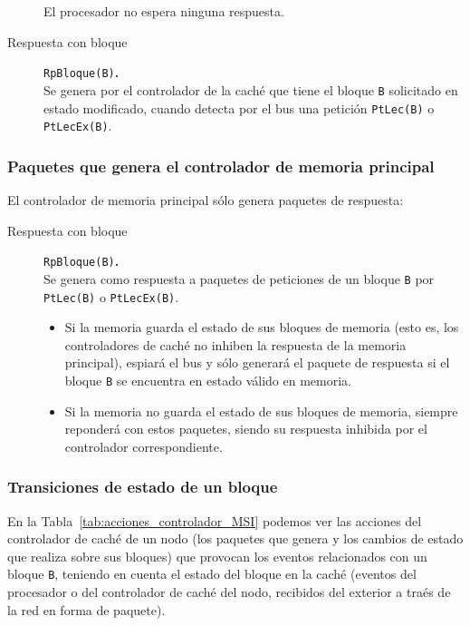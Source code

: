 \begin{description}
        El procesador no espera ninguna respuesta.
        

    \item [Respuesta con bloque] \verb|RpBloque(B)|\textbf{.}~\\
        Se genera por el controlador de la caché que tiene el bloque \verb|B| solicitado en estado modificado, cuando detecta por el bus una petición \verb|PtLec(B)| o \verb|PtLecEx(B)|.
\end{description}

\subsubsection{Paquetes que genera el controlador de memoria principal}
El controlador de memoria principal sólo genera paquetes de respuesta:
\begin{description}
    \item [Respuesta con bloque] \verb|RpBloque(B)|\textbf{.}~\\
        Se genera como respuesta a paquetes de peticiones de un bloque \verb|B| por \verb|PtLec(B)| o \verb|PtLecEx(B)|.

        \begin{itemize}
            \item Si la memoria guarda el estado de sus bloques de memoria (esto es, los controladores de caché no inhiben la respuesta de la memoria principal), espiará el bus y sólo generará el paquete de respuesta si el bloque \verb|B| se encuentra en estado válido en memoria.
            \item Si la memoria no guarda el estado de sus bloques de memoria, siempre reponderá con estos paquetes, siendo su respuesta inhibida por el controlador correspondiente.
        \end{itemize}
\end{description}

\subsubsection{Transiciones de estado de un bloque}
En la Tabla~\ref{tab:acciones_controlador_MSI} podemos ver las acciones del controlador de caché de un nodo (los paquetes que genera y los cambios de estado que realiza sobre sus bloques) que provocan los eventos relacionados con un bloque \verb|B|, teniendo en cuenta el estado del bloque en la caché (eventos del procesador o del controlador de caché del nodo, recibidos del exterior a traés de la red en forma de paquete).

